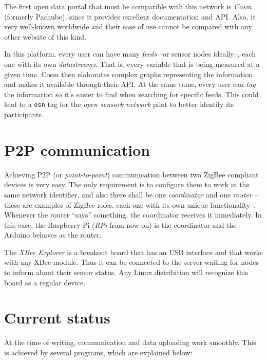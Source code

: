 \documentclass[a4paper,twocolumn]{IEEEtran}
\begin{document}
        The first open data portal that must be compatible with this network is \emph{Cosm} (formerly Pachube), since it provides excellent documentation and API. Also, it very well-known worldwide and their ease of use cannot be compared with any other website of this kind.

        In this platform, every user can have many \emph{feeds} --or sensor nodes ideally--, each one with its own \emph{datastreams}. That is, every variable that is being measured at a given time. Cosm then elaborates complex graphs representing the information and makes it available through their API. At the same tame, every user can \emph{tag} the information so it's easier to find when searching for specific feeds. This could lead to a \texttt{osn} tag for the \emph{open sensork network} pilot to better identify its participants.


    \section{P2P communication}

        Achieving P2P (or \emph{point-to-point}) communication between two ZigBee compliant devices is very easy. The only requirement is to configure them to work in the same network identifier, and also there shall be one \emph{coordinator} and one \emph{router} --these are examples of ZigBee roles, each one with its own unique functionality--. Whenever the router ``says'' something, the coordinator receives it inmediately. In this case, the Raspberry Pi (\emph{RPi} from now on) is the coordinator and the Arduino behaves as the router.
    
        The \emph{XBee Explorer} is a breakout board that has an USB interface and that works with any XBee module. Thus it can be connected to the server waiting for nodes to inform about their sensor status. Any Linux distribition will recognize this board as a regular device.

    \section{Current status}
        
        At the time of writing, communication and data uploading work smoothly. This is achieved by several programs, which are explained below:
\end{document}
